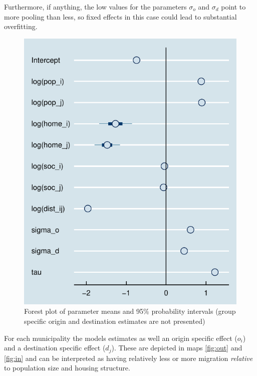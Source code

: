 \documentclass[fleqn,10pt]{SelfArx} %
\begin{document}
{{Furthermore, if anything, the low values for the parameters $\sigma_o$ and
$\sigma_d$ point to more pooling than less, so fixed effects in this case could
lead to substantial overfitting.

\begin{figure}
  \includegraphics[width = \columnwidth]{../fig/forestplot.pdf}
  \caption{Forest plot of parameter means and 95\% probability
    intervals (group specific origin and destination estimates are not
    presented)}
  \label{fig:forestplot}
\end{figure}

For each municipality the models estimates as well an origin specific effect
($o_i$) and a destination specific effect ($d_j$). These are depicted in maps
\ref{fig:out} and \ref{fig:in} and can be interpreted as having relatively less
or more migration \emph{relative} to population size and housing structure.

}}
\end{document}
